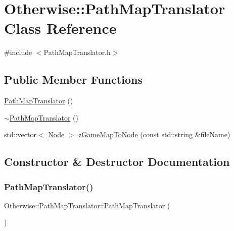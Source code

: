 \hypertarget{class_otherwise_1_1_path_map_translator}{}\section{Otherwise\+:\+:Path\+Map\+Translator Class Reference}
\label{class_otherwise_1_1_path_map_translator}


{\ttfamily \#include $<$Path\+Map\+Translator.\+h$>$}

\subsection*{Public Member Functions}
\begin{DoxyCompactItemize}
\item 
\hyperlink{class_otherwise_1_1_path_map_translator_acc3bacddf57433d22e54d40f664b5da8}{Path\+Map\+Translator} ()
\item 
\hyperlink{class_otherwise_1_1_path_map_translator_abeed95c7c0eae43710a962b745417661}{$\sim$\+Path\+Map\+Translator} ()
\item 
std\+::vector$<$ \hyperlink{struct_otherwise_1_1_node}{Node} $>$ \hyperlink{class_otherwise_1_1_path_map_translator_af6f55821ee2e71d730209b739c858b32}{z\+Game\+Map\+To\+Node} (const std\+::string \&file\+Name)
\end{DoxyCompactItemize}


\subsection{Constructor \& Destructor Documentation}
\mbox{\label{class_otherwise_1_1_path_map_translator_acc3bacddf57433d22e54d40f664b5da8}} 
\subsubsection{\texorpdfstring{Path\+Map\+Translator()}{PathMapTranslator()}}
{\footnotesize\ttfamily Otherwise\+::\+Path\+Map\+Translator\+::\+Path\+Map\+Translator (\begin{DoxyParamCaption}{ }\end{DoxyParamCaption})}

